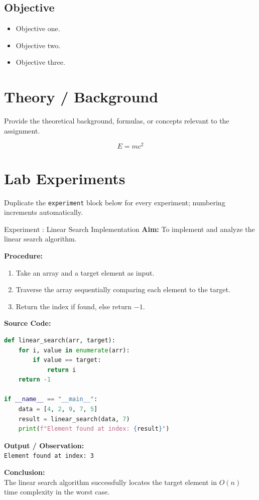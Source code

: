 \documentclass[11pt,a4paper]{article}
\newcounter{expcounter}
\newenvironment{experiment}[2]{%
  \refstepcounter{expcounter}%
  \begin{experimentbox}{Experiment \theexpcounter: #1}
  \textbf{\color{navy}Aim:} #2 \par\vspace{4pt}
}{\end{experimentbox}}
\begin{document}
\subsection{Objective}
\begin{itemize}[leftmargin=1.4em]
  \item Objective one.
  \item Objective two.
  \item Objective three.
\end{itemize}

\section{Theory / Background}
Provide the theoretical background, formulas, or concepts relevant to the assignment.

\begin{equation}
  E = mc^2
\end{equation}

\section{Lab Experiments}

Duplicate the \texttt{experiment} block below for every experiment; numbering
increments automatically.

\begin{experiment}{Linear Search Implementation}{To implement and analyze the linear search algorithm.}

\textbf{Procedure:}
\begin{enumerate}[leftmargin=1.4em]
  \item Take an array and a target element as input.
  \item Traverse the array sequentially comparing each element to the target.
  \item Return the index if found, else return $-1$.
\end{enumerate}

\textbf{\color{navy}Source Code:}
\begin{lstlisting}[language=Python, caption={Linear Search in Python}]
def linear_search(arr, target):
    for i, value in enumerate(arr):
        if value == target:
            return i
    return -1

if __name__ == "__main__":
    data = [4, 2, 9, 7, 5]
    result = linear_search(data, 7)
    print(f"Element found at index: {result}")
\end{lstlisting}

\textbf{\color{navy}Output / Observation:}\\
\texttt{Element found at index: 3}

\textbf{\color{navy}Conclusion:}\\
The linear search algorithm successfully locates the target element in
$O(n)$ time complexity in the worst case.

\end{experiment}
\end{document}
